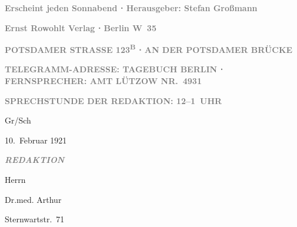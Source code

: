 \pstart
           \centering{}\textcolor{gray}{\textbf{Erscheint jeden Sonnabend ⋅ Herausgeber: Stefan Großmann}}\pend
           
\pstart
           \centering{}\textcolor{gray}{\textbf{Ernst Rowohlt Verlag ⋅ Berlin W 35}}\pend
           
\pstart
           \centering{}\textcolor{gray}{\textbf{POTSDAMER STRASSE 123\textsuperscript{B} ⋅ AN DER POTSDAMER BRÜCKE}}\pend
           
\pstart
           \centering{}\textcolor{gray}{\textbf{TELEGRAMM-ADRESSE: TAGEBUCH
                        BERLIN ⋅ FERNSPRECHER: AMT LÜTZOW
                     NR. 4931}}\pend
           
\pstart
           \centering{}\textcolor{gray}{\textbf{SPRECHSTUNDE DER REDAKTION: 12–1 UHR}}\pend
           
\pstart
           Gr/Sch\pend
           
\pstart
           \centering{}10. Februar 1921\pend
           
\pstart
           \textcolor{gray}{\textbf{\emph{REDAKTION}}}\pend
           
\pstart
           Herrn\pend
           
\pstart
           Dr.med. Arthur \pend
           
\pstart
           \pend
           
\pstart
           Sternwartstr. 71\pend
           

